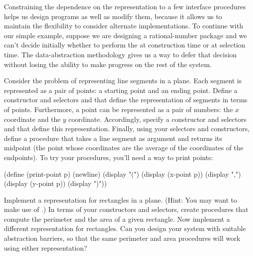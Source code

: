 Constraining the dependence on the representation to a few interface procedures helps us design programs as well as modify them, because it allows us to maintain the flexibility to consider alternate implementations.
To continue with our simple example, suppose we are designing a rational-number package and we can’t decide initially whether to perform the  at construction time or at selection time.
The data-abstraction methodology gives us a way to defer that decision without losing the ability to make progress on the rest of the system.

\begin{exercise}
	\label{Exercise 2.2}
	Consider the problem of representing line segments in a plane.
	Each segment is represented as a pair of points:
	a starting point and an ending point.
	Define a constructor  and selectors  and  that define the representation of segments in terms of points.
	Furthermore, a point can be represented as a pair of numbers:
	the \( x \) coordinate and the \( y \) coordinate.
	Accordingly, specify a constructor  and selectors  and  that define this representation.
	Finally, using your selectors and constructors, define a procedure  that takes a line segment as argument and returns its midpoint (the point whose coordinates are the average of the coordinates of the endpoints).
	To try your procedures, you’ll need a way to print points:
	\begin{scheme}
	  (define (print-point p)
	    (newline)
	    (display "(")
	    (display (x-point p))
	    (display ",")
	    (display (y-point p))
	    (display ")"))
	\end{scheme}
\end{exercise}



\begin{exercise}
	\label{Exercise 2.3}
	Implement a representation for rectangles in a plane.
	(Hint: You may want to make use of .)
	In terms of your constructors and selectors, create procedures that compute the perimeter and the area of a given rectangle.
	Now implement a different representation for rectangles.
	Can you design your system with suitable abstraction barriers, so that the same perimeter and area procedures will work using either representation?
\end{exercise}



